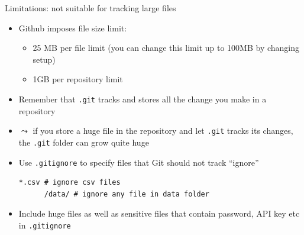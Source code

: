 \documentclass[handout,pdftex,10pt,aspectratio=169]{beamer}
\begin{document}
\begin{frame}[fragile]{Limitations: not suitable for tracking large files}
  \begin{itemize}[<+->]
    \item Github imposes file size limit:
    \begin{itemize}
      \item 25 MB per file limit 
      (you can change this limit up to 100MB by changing setup)
      \item 1GB per repository limit
    \end{itemize}
    \item Remember that \texttt{.git} tracks and stores all the change you make in a repository
    \item[] $\leadsto$ if you store a huge file in the repository and let \texttt{.git} tracks 
    its changes, the \texttt{.git} folder can grow quite huge
    \medskip
    \item Use \texttt{.gitignore} to specify files that Git should not track ``ignore''
    \begin{Verbatim}[frame=single, label=.gitignore]
      *.csv # ignore csv files
      /data/ # ignore any file in data folder
    \end{Verbatim}
    \item Include huge files as well as sensitive files that contain password, API key etc in \texttt{.gitignore}
  \end{itemize}
\end{frame}
\end{document}
